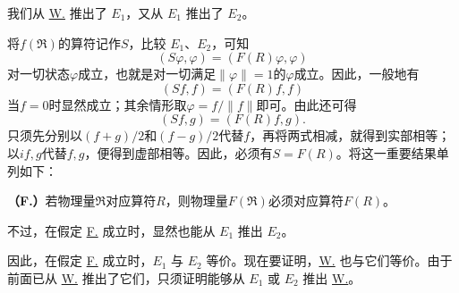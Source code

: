 \documentclass[fontsize=13pt,twoside,openany,headings=normal,parskip=false,bookmarkpackage=false,DIV=calc]{scrbook}
\begin{document}
\hypertarget{origpage-106}{}\label{origpage-106}我们从 \hyperref[post:III.1.W]{W.} 推出了 \hyperref[post:III.1.E1]{$E_1$}，又从 \hyperref[post:III.1.E1]{$E_1$} 推出了 \hyperref[post:III.1.E2]{$E_2$}。

将$f(\mathfrak R)$的算符记作$S$，比较 \hyperref[post:III.1.E1]{$E_1$}、\hyperref[post:III.1.E2]{$E_2$}，可知
\[
(S\varphi,\varphi)=(F(R)\varphi,\varphi)
\]
对一切状态$\varphi$成立，也就是对一切满足$\|\varphi\|=1$的$\varphi$成立。因此，一般地有
\[
(Sf,f)=(F(R)f,f)
\]
当$f=0$时显然成立；其余情形取$\varphi=f/\|f\|$即可。由此还可得
\[
(Sf,g)=(F(R)f,g).
\]
只须先分别以$(f+g)/2$和$(f-g)/2$代替$f$，再将两式相减，就得到实部相等；以$if,\allowbreak g$代替$f,\allowbreak g$，便得到虚部相等。因此，必须有$S=F(R)$。将这一重要结果单列如下：

\leavevmode{}\label{post:III.1.F}\textbf{（F.）}若物理量$\mathfrak R$对应算符$R$，则物理量$F(\mathfrak R)$必须对应算符$F(R)$。

不过，在假定 \hyperref[post:III.1.F]{F.} 成立时，显然也能从 \hyperref[post:III.1.E1]{$E_1$} 推出 \hyperref[post:III.1.E2]{$E_2$}。

因此，在假定 \hyperref[post:III.1.F]{F.} 成立时，\hyperref[post:III.1.E1]{$E_1$} 与 \hyperref[post:III.1.E2]{$E_2$} 等价。现在要证明，\hyperref[post:III.1.W]{W.} 也与它们等价。由于前面已从 \hyperref[post:III.1.W]{W.} 推出了它们，只须证明能够从 \hyperref[post:III.1.E1]{$E_1$} 或 \hyperref[post:III.1.E2]{$E_2$} 推出 \hyperref[post:III.1.W]{W.}。
\end{document}
